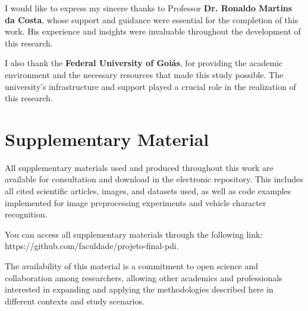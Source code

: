 \documentclass[conference]{IEEEtran}
\begin{document}
	I would like to express my sincere thanks to Professor \textbf{Dr. Ronaldo Martins da Costa}, whose support and guidance were essential for the completion of this work. His experience and insights were invaluable throughout the development of this research.
	
	I also thank the \textbf{Federal University of Goiás}, for providing the academic environment and the necessary resources that made this study possible. The university's infrastructure and support played a crucial role in the realization of this research.
	
	\section{Supplementary Material}
	
	All supplementary materials used and produced throughout this work are available for consultation and download in the electronic repository. This includes all cited scientific articles, images, and datasets used, as well as code examples implemented for image preprocessing experiments and vehicle character recognition.
	
	You can access all supplementary materials through the following link: https://github.com/faculdade/projeto-final-pdi.
	
	The availability of this material is a commitment to open science and collaboration among researchers, allowing other academics and professionals interested in expanding and applying the methodologies described here in different contexts and study scenarios.
	
\end{document}
